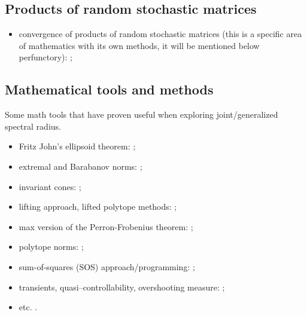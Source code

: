 \subsection*{Products of random stochastic matrices}
\begin{itemize}

\item convergence of products of random stochastic matrices (this is a specific area of mathematics with its own methods, it will be mentioned below perfunctory): \cite{AT:JMAA77, BXMS:IEEETSP13, Cohn:IJMMS, CMS:LAA21, DHH:ArXiv14, DHX:AUT11, OgurMart:LAA13, Leiz:LAA92, LimaRah:JPA94, Prot:MS11, Thomas:ArXiv11, Thomas:ArXiv13, Wolf:PAMS};
\end{itemize}

\subsection*{Mathematical tools and methods}
Some math tools that have proven useful when exploring joint/generalized spectral radius.

\begin{itemize}
\item Fritz John's ellipsoid theorem: \cite{ShihHsu:JNCA11, JohnF:48, JohnF:2014, Howard97, Shih:TM99};
\item extremal and Barabanov norms: \cite{ABMW:MTNS12, Bar:AIT88-5:e, Bar:AIT88-3:e, Bar:AIT88-2:e, Dai:JMAA11, GWZ:SIAMJMA05, GugZen:SIAMJMAA09, MasWir:LAA14, MejProt:ArXiv21-2, Morris:LAA10, Morris:SIAMJMAA12, Prot:LAA08, TeiMarg:Autom12, Wirth:CDC05, Wirth:LAA02, Wirth:MNTS02};
\item invariant cones: \cite{Seneta06};
\item lifting approach, lifted polytope methods: \cite{BN03, JGC:SIAMJMAA14, Koz:LAA14, ParJdb:LAA08, JSRToolbox, XuAci:IEEETAC20};
\item max version of the Perron-Frobenius theorem: \cite{Bapat:LAA98};
\item polytope norms: \cite{GWZ:SIAMJMA05, GugZen:SIAMJMAA09, GugZen:JCA97};
\item sum-of-squares (SOS) approach/programming: \cite{Ahmadi08, AhmJun:CDC13, AhmJun14, AJPR:SIAMJCO14, AJPR:HCSS11, AhmPar:CDC05, DRD:IEEETAC18, LJP:HSCC16, LPG:SIAM20, ParJdb:LNCS07, ParJdb:LAA08, WangMM:ArXiv20, ZhangXu:ArXiv20};
\item transients, quasi--controllability, overshooting measure: \cite{KKP:IFAC94, KKP:CESA98, KozPok:CADSEM96-005, PW:LAA08, PWB:CDC05};
\item etc. \cite{Bochi:LAA03, Gelf:MatSb41:e, Rota03}.
\end{itemize}



